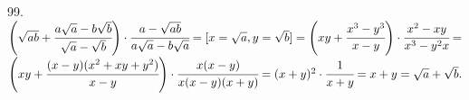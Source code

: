 99. $\left(\sqrt{ab}+\cfrac{a\sqrt{a}-b\sqrt{b}}{\sqrt{a}-\sqrt{b}}\right)\cdot\cfrac{a-\sqrt{ab}}{a\sqrt{a}-b\sqrt{a}}=
[x=\sqrt{a}, y=\sqrt{b}]=\left(xy+\cfrac{x^3-y^3}{x-y}\right)\cdot\cfrac{x^2-xy}{x^3-y^2x}=$\\$
\left(xy+\cfrac{(x-y)(x^2+xy+y^2)}{x-y}\right)\cdot\cfrac{x(x-y)}{x(x-y)(x+y)}=
(x+y)^2\cdot\cfrac{1}{x+y}=x+y=\sqrt{a}+\sqrt{b}.$\\
